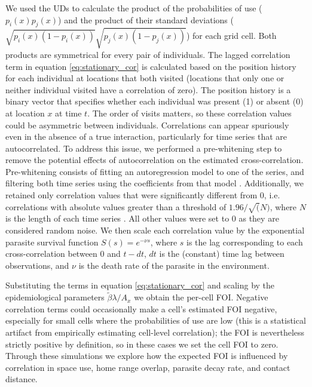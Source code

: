 \documentclass[letterpaper]{article}
\begin{document}
We used the UDs to calculate the product of the probabilities of use ($p_i(x)p_j(x)$) and the product of their standard deviations ($\sqrt{p_i(x)(1-p_i(x))}\sqrt{p_j(x)(1-p_j(x))}$) for each grid cell. Both products are symmetrical for every pair of individuals. 
The lagged correlation term in equation \ref{eq:stationary_cor} is calculated based on the position history for each individual at locations that both visited (locations that only one or neither individual visited have a correlation of zero). The position history is a binary vector that specifies whether each individual was present (1) or absent (0) at location $x$ at time $t$. 
The order of visits matters, so these correlation values could be asymmetric between individuals. 
Correlations can appear spuriously even in the absence of a true interaction, particularly for time series that are autocorrelated. To address this issue, we performed a pre-whitening step to remove the potential effects of autocorrelation on the estimated cross-correlation. Pre-whitening consists of fitting an autoregression model to one of the series, and filtering both time series using the coefficients from that model \citep{Dean2016}. Additionally, we retained only correlation values that were significantly different from 0, i.e. correlations with absolute values greater than a threshold of $1.96/\sqrt(N)$, where $N$ is the length of each time series \citep{Dean2016}. All other values were set to 0 as they are considered random noise.
We then scale each correlation value by the exponential parasite survival function $S(s) = e^{-\nu s}$, where $s$ is the lag corresponding to each cross-correlation between 0 and $t-dt$, $dt$ is the (constant) time lag between observations, and $\nu$ is the death rate of the parasite in the environment. 

Substituting the terms in equation \ref{eq:stationary_cor} and scaling by the epidemiological parameters $\tilde\beta\lambda/ A_x$ we obtain the per-cell FOI. Negative correlation terms could occasionally make a cell's estimated FOI negative, especially for small cells where the probabilities of use are low (this is a statistical artifact from empirically estimating cell-level correlation); the FOI is nevertheless strictly positive by definition, so in these cases we set the cell FOI to zero.
Through these simulations we explore how the expected FOI is influenced by correlation in space use, home range overlap, parasite decay rate, and contact distance. %
\end{document}
